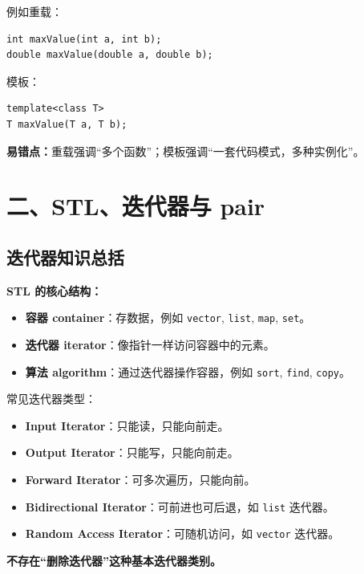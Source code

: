 \documentclass[11pt, a4paper]{article}
\begin{document}
例如重载：
\begin{lstlisting}
int maxValue(int a, int b);
double maxValue(double a, double b);
\end{lstlisting}

模板：
\begin{lstlisting}
template<class T>
T maxValue(T a, T b);
\end{lstlisting}

\textbf{易错点：}重载强调“多个函数”；模板强调“一套代码模式，多种实例化”。


\section*{二、STL、迭代器与 pair}

\subsection*{迭代器知识总括}

\textbf{STL 的核心结构：}
\begin{itemize}
    \item \textbf{容器 container}：存数据，例如 \texttt{vector}, \texttt{list}, \texttt{map}, \texttt{set}。
    \item \textbf{迭代器 iterator}：像指针一样访问容器中的元素。
    \item \textbf{算法 algorithm}：通过迭代器操作容器，例如 \texttt{sort}, \texttt{find}, \texttt{copy}。
\end{itemize}

常见迭代器类型：
\begin{itemize}
    \item \textbf{Input Iterator}：只能读，只能向前走。
    \item \textbf{Output Iterator}：只能写，只能向前走。
    \item \textbf{Forward Iterator}：可多次遍历，只能向前。
    \item \textbf{Bidirectional Iterator}：可前进也可后退，如 \texttt{list} 迭代器。
    \item \textbf{Random Access Iterator}：可随机访问，如 \texttt{vector} 迭代器。
\end{itemize}

\textbf{不存在“删除迭代器”这种基本迭代器类别。}

\end{document}
